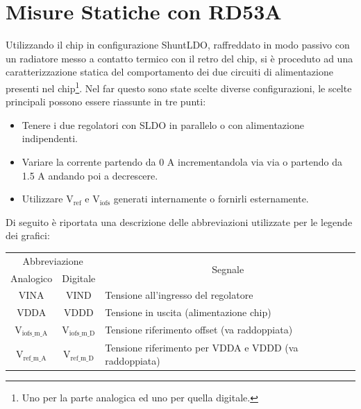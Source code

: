\section{Misure Statiche con RD53A}
Utilizzando il chip in configurazione ShuntLDO, raffreddato in modo passivo con un radiatore messo a contatto termico con il retro del chip, si è proceduto ad una caratterizzazione statica del comportamento dei due circuiti di alimentazione presenti nel chip\footnote{Uno per la parte analogica ed uno per quella digitale.}. 
Nel far questo sono state scelte diverse configurazioni, le scelte principali possono essere riassunte in tre punti:
\begin{itemize}
\item Tenere i due regolatori con SLDO in parallelo o con alimentazione indipendenti.
\item Variare la corrente partendo da 0 A incrementandola via via o partendo da 1.5 A andando poi a decrescere.
\item Utilizzare $\mathrm{V_{ref}}$ e $\mathrm{V_{iofs}}$ generati internamente o fornirli esternamente.
\end{itemize}

Di seguito è riportata una descrizione delle abbreviazioni utilizzate per le legende dei grafici:

\begin{center}
\begin{tabularx}{\linewidth}{|cc|X|}
\hline
\multicolumn{2}{|c|}{Abbreviazione} & \multicolumn{1}{c|}{\multirow{2}{*}{Segnale}}\\ 
Analogico & Digitale & \\
\hline
VINA & VIND & Tensione all'ingresso del regolatore  \\ \hline
VDDA & VDDD & Tensione in uscita (alimentazione chip) \\ \hline
$\mathrm{V_{iofs \_ m \_ A}}$ & $\mathrm{V_{iofs \_ m \_ D}}$ & Tensione riferimento offset (va raddoppiata) \\ \hline   
$\mathrm{V_{ref \_ m \_ A}}$ & $\mathrm{V_{ref \_ m \_ D}}$ & Tensione riferimento per VDDA e VDDD (va raddoppiata)\\ \hline   
\end{tabularx}
\end{center}

